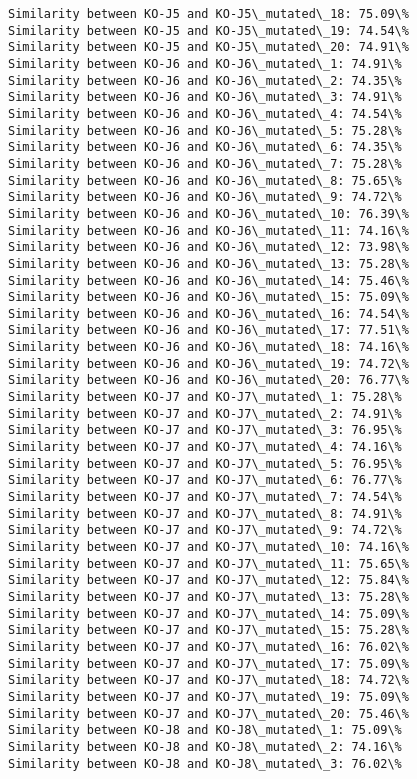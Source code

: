\documentclass[11pt]{article}
\begin{document}
\begin{Verbatim}[commandchars=\\\{\}]
Similarity between KO-J5 and KO-J5\_mutated\_18: 75.09\%
Similarity between KO-J5 and KO-J5\_mutated\_19: 74.54\%
Similarity between KO-J5 and KO-J5\_mutated\_20: 74.91\%
Similarity between KO-J6 and KO-J6\_mutated\_1: 74.91\%
Similarity between KO-J6 and KO-J6\_mutated\_2: 74.35\%
Similarity between KO-J6 and KO-J6\_mutated\_3: 74.91\%
Similarity between KO-J6 and KO-J6\_mutated\_4: 74.54\%
Similarity between KO-J6 and KO-J6\_mutated\_5: 75.28\%
Similarity between KO-J6 and KO-J6\_mutated\_6: 74.35\%
Similarity between KO-J6 and KO-J6\_mutated\_7: 75.28\%
Similarity between KO-J6 and KO-J6\_mutated\_8: 75.65\%
Similarity between KO-J6 and KO-J6\_mutated\_9: 74.72\%
Similarity between KO-J6 and KO-J6\_mutated\_10: 76.39\%
Similarity between KO-J6 and KO-J6\_mutated\_11: 74.16\%
Similarity between KO-J6 and KO-J6\_mutated\_12: 73.98\%
Similarity between KO-J6 and KO-J6\_mutated\_13: 75.28\%
Similarity between KO-J6 and KO-J6\_mutated\_14: 75.46\%
Similarity between KO-J6 and KO-J6\_mutated\_15: 75.09\%
Similarity between KO-J6 and KO-J6\_mutated\_16: 74.54\%
Similarity between KO-J6 and KO-J6\_mutated\_17: 77.51\%
Similarity between KO-J6 and KO-J6\_mutated\_18: 74.16\%
Similarity between KO-J6 and KO-J6\_mutated\_19: 74.72\%
Similarity between KO-J6 and KO-J6\_mutated\_20: 76.77\%
Similarity between KO-J7 and KO-J7\_mutated\_1: 75.28\%
Similarity between KO-J7 and KO-J7\_mutated\_2: 74.91\%
Similarity between KO-J7 and KO-J7\_mutated\_3: 76.95\%
Similarity between KO-J7 and KO-J7\_mutated\_4: 74.16\%
Similarity between KO-J7 and KO-J7\_mutated\_5: 76.95\%
Similarity between KO-J7 and KO-J7\_mutated\_6: 76.77\%
Similarity between KO-J7 and KO-J7\_mutated\_7: 74.54\%
Similarity between KO-J7 and KO-J7\_mutated\_8: 74.91\%
Similarity between KO-J7 and KO-J7\_mutated\_9: 74.72\%
Similarity between KO-J7 and KO-J7\_mutated\_10: 74.16\%
Similarity between KO-J7 and KO-J7\_mutated\_11: 75.65\%
Similarity between KO-J7 and KO-J7\_mutated\_12: 75.84\%
Similarity between KO-J7 and KO-J7\_mutated\_13: 75.28\%
Similarity between KO-J7 and KO-J7\_mutated\_14: 75.09\%
Similarity between KO-J7 and KO-J7\_mutated\_15: 75.28\%
Similarity between KO-J7 and KO-J7\_mutated\_16: 76.02\%
Similarity between KO-J7 and KO-J7\_mutated\_17: 75.09\%
Similarity between KO-J7 and KO-J7\_mutated\_18: 74.72\%
Similarity between KO-J7 and KO-J7\_mutated\_19: 75.09\%
Similarity between KO-J7 and KO-J7\_mutated\_20: 75.46\%
Similarity between KO-J8 and KO-J8\_mutated\_1: 75.09\%
Similarity between KO-J8 and KO-J8\_mutated\_2: 74.16\%
Similarity between KO-J8 and KO-J8\_mutated\_3: 76.02\%

\end{Verbatim}
\end{document}
